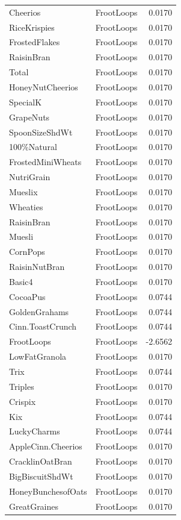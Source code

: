 \begin{longtable}{llr}
Cheerios & FrootLoops & 0.0170 \\
RiceKrispies & FrootLoops & 0.0170 \\
FrostedFlakes & FrootLoops & 0.0170 \\
RaisinBran & FrootLoops & 0.0170 \\
Total & FrootLoops & 0.0170 \\
HoneyNutCheerios & FrootLoops & 0.0170 \\
SpecialK & FrootLoops & 0.0170 \\
GrapeNuts & FrootLoops & 0.0170 \\
SpoonSizeShdWt & FrootLoops & 0.0170 \\
100\%Natural & FrootLoops & 0.0170 \\
FrostedMiniWheats & FrootLoops & 0.0170 \\
NutriGrain & FrootLoops & 0.0170 \\
Mueslix & FrootLoops & 0.0170 \\
Wheaties & FrootLoops & 0.0170 \\
RaisinBran & FrootLoops & 0.0170 \\
Muesli & FrootLoops & 0.0170 \\
CornPops & FrootLoops & 0.0170 \\
RaisinNutBran & FrootLoops & 0.0170 \\
Basic4 & FrootLoops & 0.0170 \\
CocoaPus & FrootLoops & 0.0744 \\
GoldenGrahams & FrootLoops & 0.0744 \\
Cinn.ToastCrunch & FrootLoops & 0.0744 \\
FrootLoops & FrootLoops & -2.6562 \\
LowFatGranola & FrootLoops & 0.0170 \\
Trix & FrootLoops & 0.0744 \\
Triples & FrootLoops & 0.0170 \\
Crispix & FrootLoops & 0.0170 \\
Kix & FrootLoops & 0.0744 \\
LuckyCharms & FrootLoops & 0.0744 \\
AppleCinn.Cheerios & FrootLoops & 0.0170 \\
CracklinOatBran & FrootLoops & 0.0170 \\
BigBiscuitShdWt & FrootLoops & 0.0170 \\
HoneyBunchesofOats & FrootLoops & 0.0170 \\
GreatGraines & FrootLoops & 0.0170 \\

\end{longtable}
